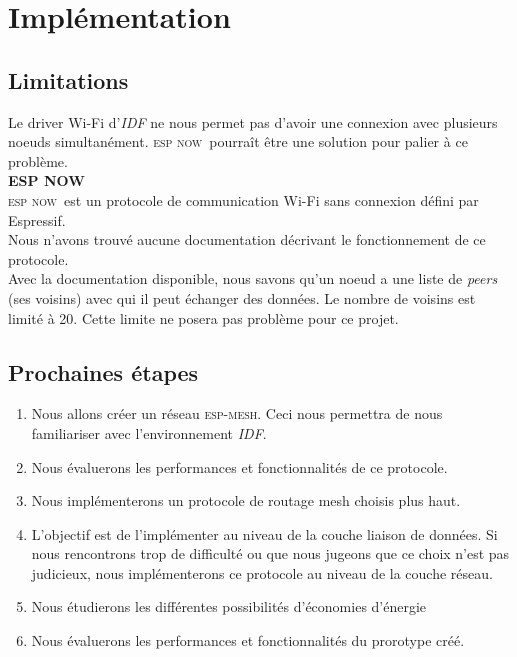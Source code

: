 \documentclass[a4paper, 12pt]{report}
\newcommand{\espmesh}{\textsc{esp-mesh}}
\newcommand{\espnow}{\textsc{esp now}}
\begin{document}
\chapter{Implémentation}
\section{Limitations}
        Le driver Wi-Fi d'\textit{IDF} ne nous permet pas d'avoir une connexion
        avec plusieurs noeuds simultanément. \espnow\ pourraît être une solution
        pour palier à ce problème.\\
    
    
        \textbf{ESP NOW}\\
            \espnow\ est un protocole de communication Wi-Fi sans connexion défini par Espressif.\\
            Nous n'avons trouvé aucune documentation décrivant le fonctionnement de ce protocole.\\
            Avec la documentation disponible, nous savons qu'un noeud a une liste de \textit{peers} (ses voisins) avec qui il peut échanger des données.
            Le nombre de voisins est limité à 20. Cette limite ne posera pas problème pour ce projet.
        

\section{Prochaines étapes}
        \begin{enumerate}
            \item Nous allons créer un réseau \espmesh. Ceci nous permettra de nous
            familiariser avec l'environnement \textit{IDF}.
            \item Nous évaluerons les performances et fonctionnalités de ce protocole.
            \item Nous implémenterons un protocole de routage mesh choisis plus haut.
            \item L'objectif est de l'implémenter au niveau de la couche liaison de données.
                Si nous rencontrons trop de difficulté ou que nous jugeons que ce choix n'est pas judicieux,
                nous implémenterons ce protocole au niveau de la couche réseau.
            \item Nous étudierons les différentes possibilités d'économies d'énergie
            \item Nous évaluerons les performances et fonctionnalités du prorotype créé. 
            
        \end{enumerate}

{}

\end{document}
